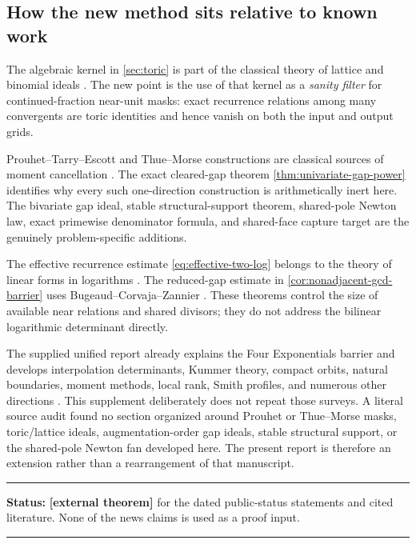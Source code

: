 \documentclass[11pt,oneside]{article}
\theoremstyle{definition}
\theoremstyle{remark}
\newcommand{\statusexternal}{\textcolor{externalblue}{\textbf{[external theorem]}}}
\newenvironment{statusbox}[1]
{\begin{center}\begin{minipage}{0.94\textwidth}\raggedright\hrule\vspace{0.45em}
\textbf{Status:} #1\par\vspace{0.35em}}
{\vspace{0.35em}\hrule\end{minipage}\end{center}}
\begin{document}
\subsection{How the new method sits relative to known work}

The algebraic kernel in \cref{sec:toric} is part of the classical theory of lattice
and binomial ideals \cite{EisenbudSturmfels1996,Sturmfels1996}.  The new point is the use of
that kernel as a \emph{sanity filter} for continued-fraction near-unit masks: exact recurrence
relations among many convergents are toric identities and hence vanish on both the input and
output grids.

Prouhet--Tarry--Escott and Thue--Morse constructions are classical sources of moment
cancellation \cite{AlloucheShallit2003}.  The exact cleared-gap theorem
\cref{thm:univariate-gap-power} identifies why every such one-direction construction is
arithmetically inert here.  The bivariate gap ideal, stable structural-support theorem, shared-pole Newton law, exact
primewise denominator formula, and shared-face capture target are the genuinely
problem-specific additions.

The effective recurrence estimate \eqref{eq:effective-two-log} belongs to the theory of linear
forms in logarithms \cite{Baker1975,LaurentMignotteNesterenko1995}.  The reduced-gap estimate in
\cref{cor:nonadjacent-gcd-barrier} uses Bugeaud--Corvaja--Zannier
\cite{BugeaudCorvajaZannier2003}.  These theorems control the size of available near relations
and shared divisors; they do not address the bilinear logarithmic determinant directly.

The supplied unified report already explains the Four Exponentials barrier and develops
interpolation determinants, Kummer theory, compact orbits, natural boundaries, moment
methods, local rank, Smith profiles, and numerous other directions
\cite{UnifiedReport2026}.  This supplement deliberately does not repeat those surveys.
A literal source audit found no section organized around Prouhet or Thue--Morse masks,
toric/lattice ideals, augmentation-order gap ideals, stable structural support, or the
shared-pole Newton fan developed here.  The present report is
therefore an extension rather than a rearrangement of that manuscript.

\begin{statusbox}{\statusexternal{} for the dated public-status statements and cited
literature.  None of the news claims is used as a proof input.}
\end{statusbox}
\end{document}

